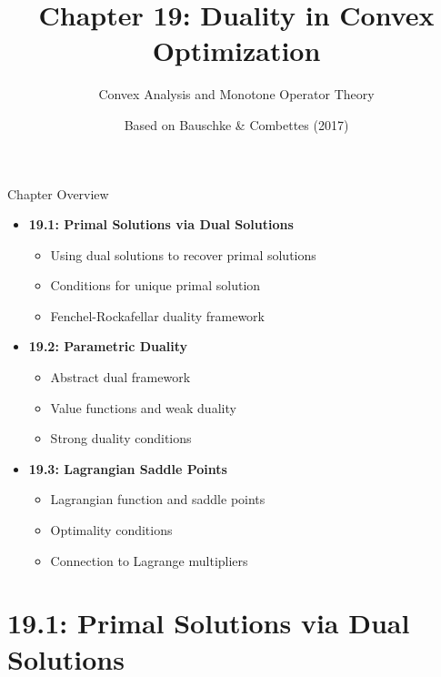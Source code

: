 \documentclass[aspectratio=169,10pt]{beamer}
\title{Chapter 19: Duality in Convex Optimization}
\subtitle{Convex Analysis and Monotone Operator Theory}
\author{Based on Bauschke \& Combettes (2017)}
\date{}
\begin{document}
\frame{\titlepage}

\begin{frame}{Chapter Overview}
    \begin{itemize}
        \item \textbf{19.1: Primal Solutions via Dual Solutions}
        \begin{itemize}
            \item Using dual solutions to recover primal solutions
            \item Conditions for unique primal solution
            \item Fenchel-Rockafellar duality framework
        \end{itemize}

        \item \textbf{19.2: Parametric Duality}
        \begin{itemize}
            \item Abstract dual framework
            \item Value functions and weak duality
            \item Strong duality conditions
        \end{itemize}

        \item \textbf{19.3: Lagrangian Saddle Points}
        \begin{itemize}
            \item Lagrangian function and saddle points
            \item Optimality conditions
            \item Connection to Lagrange multipliers
        \end{itemize}
    \end{itemize}
\end{frame}

\section{19.1: Primal Solutions via Dual Solutions}
\end{document}

